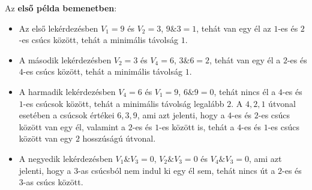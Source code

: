 





\Examples
\begin{example}
%
%
\end{example}


\Explanation
Az \textbf{első példa bemenetben}:
\begin{itemize}
\item Az első lekérdezésben $V_1 = 9$ és $V_2 = 3$, $9\& 3 = 1$, tehát van egy él az $1$-es és $2$-es csúcs között, tehát a minimális távolság $1$. 
\item A második lekérdezésben $V_2 = 3$ és $V_4 = 6$, $3\& 6 = 2$, tehát van egy él a $2$-es és $4$-es csúcs között, tehát a minimális távolság $1$. 
 \item A harmadik lekérdezésben $V_4 = 6$ és $V_1 = 9$, $6\& 9 = 0$, tehát nincs él a $4$-es és $1$-es csúcsok között, tehát a minimális távolság legalább $2$. A $4, 2, 1$ útvonal esetében a csúcsok értékei $6, 3, 9$, ami azt jelenti, hogy a $4$-es és $2$-es csúcs között van egy él, valamint a $2$-es és $1$-es között is, tehát a $4$-es és $1$-es csúcs között van egy $2$ hosszúságú útvonal.
\item A negyedik lekérdezésben $V_1 \& V_3 = 0$, $V_2 \& V_3 = 0$ és $V_4 \& V_3 = 0$, ami azt jelenti, hogy a $3$-as csúcsból nem indul ki egy él sem, tehát nincs út a $2$-es és $3$-as csúcs között.
\end{itemize}
